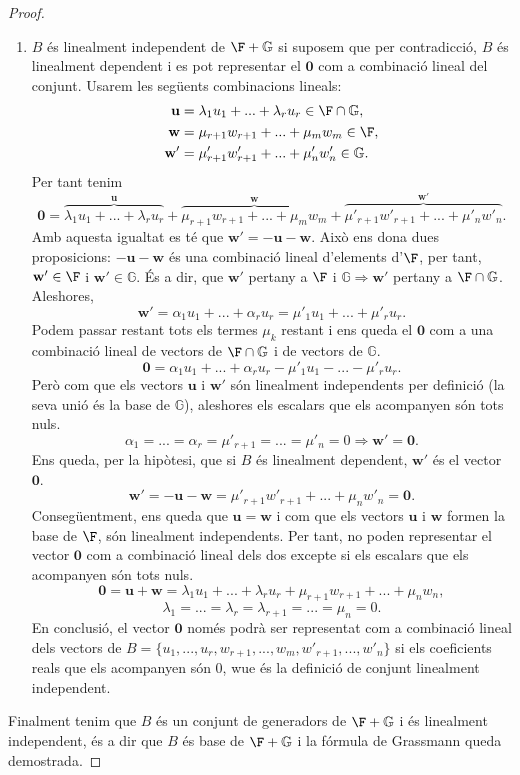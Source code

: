 \begin{proof}
\begin{enumerate}[(1)]
\item $B$ és linealment independent de $\F+\mathbb{G}$ si suposem que per contradicció, $B$ és linealment dependent i es pot representar el $\mathbf{0}$ com a combinació lineal del conjunt. Usarem les següents combinacions lineals: 
\begin{align*}
    \mathbf{u} &= \lambda_1 u_1 + ... + \lambda_r u_r \in \F\cap\mathbb{G}, \\
    \mathbf{w} &= \mu_{r+1} w_{r+1} + ... + \mu_m w_m \in \F, \\
    \mathbf{w'} &= \mu'_{r+1} w'_{r+1} + ... + \mu'_n w'_n \in \mathbb{G}.
\end{align*}
Per tant tenim
\[
    \mathbf{0} = \overbrace{\lambda_1 u_1 + ... + \lambda_r u_r}^{\mathbf{u}} + \overbrace{\mu_{r+1} w_{r+1} + ... + \mu_m w_m}^{\mathbf{w}} + \overbrace{\mu'_{r+1} w'_{r+1} + ... + \mu'_n w'_n}^{\mathbf{w'}}.
\]
Amb aquesta igualtat es té que $\mathbf{w'} = -\mathbf{u} -\mathbf{w}$. Això ens dona dues proposicions: $-\mathbf{u} -\mathbf{w}$ és una combinació lineal d'elements d'$\F$, per tant, $\mathbf{w'} \in \F$ i $\mathbf{w'} \in \mathbb{G}$. És a dir, que $\mathbf{w'}$ pertany a $\F$ i $\mathbb{G}\Rightarrow \mathbf{w'}$ pertany a $\F\cap\mathbb{G}$. Aleshores,
\[ \mathbf{w'} = \alpha_1 u_1 + ... + \alpha_r u_r = \mu'_1 u_1 + ... + \mu'_r u_r. \]
Podem passar restant tots els termes $\mu_k$ restant i ens queda el $\mathbf{0}$ com a una combinació lineal de vectors de $\F\cap\mathbb{G}$ i de vectors de $\mathbb{G}$.
\[ \mathbf{0} = \alpha_1 u_1 + ... + \alpha_r u_r - \mu'_1 u_1 - ... - \mu'_r u_r. \]
Però com que els vectors $\mathbf{u}$ i $\mathbf{w'}$ són linealment independents per definició (la seva unió és la base de $\mathbb{G}$), aleshores els escalars que els acompanyen són tots nuls.
\[ \alpha_1 = ... = \alpha_r = \mu'_{r+1} = ... = \mu'_{n} = 0 \Rightarrow \mathbf{w'} = \mathbf{0}.\]
Ens queda, per la hipòtesi, que si $B$ és linealment dependent, $\mathbf{w'}$ és el vector $\mathbf{0}$.
\[
\mathbf{w'} = -\mathbf{u} - \mathbf{w} = \mu'_{r+1} w'_{r+1} + ... + \mu_n w'_n = \mathbf{0}.
\]
Consegüentment, ens queda que $\mathbf{u} = \mathbf{w}$ i com que els vectors $\mathbf{u}$ i $\mathbf{w}$ formen la base de $\F$, són linealment independents. Per tant, no poden representar el vector $\mathbf{0}$ com a combinació lineal dels dos excepte si els escalars que els acompanyen són tots nuls.
\[\mathbf{0} = \mathbf{u} + \mathbf{w} = \lambda_1 u_1 + ... + \lambda_r u_r + \mu_{r+1} w_{r+1} + ... + \mu_n w_n,\]
\[ \lambda_1 = ... = \lambda_r = \lambda_{r+1} = ... = \mu_n = 0. \]
En conclusió, el vector $\mathbf{0}$ només podrà ser representat com a combinació lineal dels vectors de $B = \{u_1,...,u_r, w_{r+1}, ..., w_m, w'_{r+1},...,w'_n\}$ si els coeficients reals que els acompanyen són $0$, wue és la definició de conjunt linealment independent.
\end{enumerate}

Finalment tenim que $B$ és un conjunt de generadors de $\F+\mathbb{G}$ i és linealment independent, és a dir que $B$ és base de $\F+\mathbb{G}$ i la fórmula de Grassmann queda demostrada. 
\end{proof}

